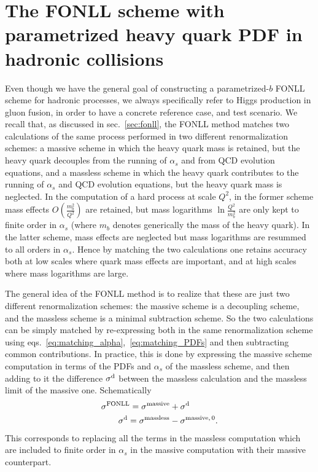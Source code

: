 \section{The FONLL scheme with parametrized heavy quark PDF
  in hadronic collisions}
\label{sec:FONLL-HI}

Even though we have the general goal of constructing a parametrized-$b$
FONLL scheme for hadronic processes, we  always specifically refer to Higgs
production in gluon fusion, in order to have  a concrete reference
case, and  test scenario. We recall that, as discussed in sec.~\ref{sec:fonll}, the FONLL
method matches two calculations of the same process
performed in two different renormalization schemes: a massive scheme
in which the heavy quark mass is retained, but the heavy quark
decouples from the running of $\alpha_s$ and from QCD evolution
equations, and a massless scheme in which the heavy quark contributes
to the running of $\alpha_s$ and QCD evolution
equations, but the heavy quark mass is neglected.
In the computation of a hard process at scale $Q^2$, in the former scheme
mass effects $O\left(\frac {m_b^2}{Q^2}\right)$
are retained, but mass logarithms $\ln\frac{Q^2}{m_b^2}$
 are only
kept to finite order in $\alpha_s$ (where $m_b$ denotes generically
the mass of the heavy quark). In the latter scheme, mass effects
are neglected but mass logarithms are resummed to all orders in
$\alpha_s$. Hence by matching the two calculations one retains
accuracy both at low scales where quark mass effects are important, and
at high scales where mass logarithms are large.

The general idea of the FONLL method is to realize that these are just
two different renormalization schemes: the massive scheme is a
decoupling scheme, and the massless scheme is a minimal subtraction
scheme. So the two calculations can be simply matched by re-expressing
both in the same renormalization scheme using eqs.~\eqref{eq:matching_alpha},~\eqref{eq:matching_PDFs}
and then subtracting common contributions. In practice, this is done by expressing the massive
scheme computation in terms of the PDFs and $\alpha_s$ of the
massless scheme, and then adding to it the difference $\sigma ^{\rm
  d}$
between the massless calculation and the massless limit of the
massive one. Schematically
\begin{align}\label{eq:fonlldef}
&  \sigma^{\text{FONLL}} = \sigma^{\rm massive} +\sigma ^{\rm d}\\
&\qquad \sigma ^{\rm d}=\sigma^{\rm massless}-\sigma^{\rm massive,\,0}.\label{eq:fonlldiff}
\end{align}
This corresponds to replacing all the terms in the massless
computation which are included to finite order in $\alpha_s$ in the
massive computation with their massive counterpart.


